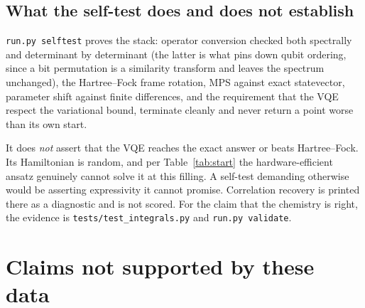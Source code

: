 \documentclass[11pt,a4paper]{article}
\newcommand{\code}[1]{\texttt{\small #1}}
\begin{document}
\subsection{What the self-test does and does not establish}

\code{run.py selftest} proves the stack: operator conversion checked both
spectrally and determinant by determinant (the latter is what pins down qubit
ordering, since a bit permutation is a similarity transform and leaves the
spectrum unchanged), the Hartree--Fock frame rotation, MPS against exact
statevector, parameter shift against finite differences, and the requirement
that the VQE respect the variational bound, terminate cleanly and never return a
point worse than its own start.

It does \emph{not} assert that the VQE reaches the exact answer or beats
Hartree--Fock. Its Hamiltonian is random, and per Table~\ref{tab:start} the
hardware-efficient ansatz genuinely cannot solve it at this filling. A self-test
demanding otherwise would be asserting expressivity it cannot promise.
Correlation recovery is printed there as a diagnostic and is not scored. For the
claim that the chemistry is right, the evidence is
\code{tests/test\_integrals.py} and \code{run.py validate}.

\section{Claims not supported by these data}
\label{sec:unsupported}
\end{document}
